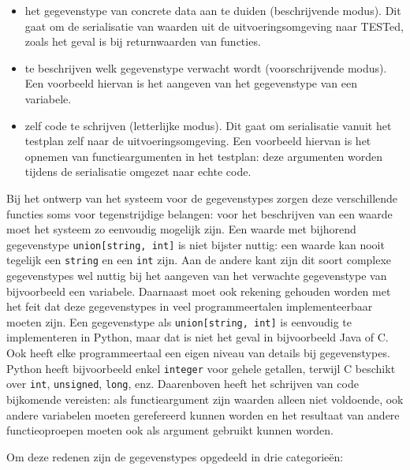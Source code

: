 \begin{itemize}
    \item het gegevenstype van concrete data aan te duiden (beschrijvende modus).
    Dit gaat om de serialisatie van waarden uit de uitvoeringsomgeving naar TESTed, zoals het geval is bij returnwaarden van functies.
    \item te beschrijven welk gegevenstype verwacht wordt (voorschrijvende modus).
    Een voorbeeld hiervan is het aangeven van het gegevenstype van een variabele.
    \item zelf code te schrijven (letterlijke modus).
    Dit gaat om serialisatie vanuit het testplan zelf naar de uitvoeringsomgeving.
    Een voorbeeld hiervan is het opnemen van functieargumenten in het testplan: deze argumenten worden tijdens de serialisatie omgezet naar echte code.
\end{itemize}

Bij het ontwerp van het systeem voor de gegevenstypes zorgen deze verschillende functies soms voor tegenstrijdige belangen: voor het beschrijven van een waarde moet het systeem zo eenvoudig mogelijk zijn.
Een waarde met bijhorend gegevenstype \texttt{union[string, int]} is niet bijster nuttig: een waarde kan nooit tegelijk een \texttt{string} en een \texttt{int} zijn.
Aan de andere kant zijn dit soort complexe gegevenstypes wel nuttig bij het aangeven van het verwachte gegevenstype van bijvoorbeeld een variabele.
Daarnaast moet ook rekening gehouden worden met het feit dat deze gegevenstypes in veel programmeertalen implementeerbaar moeten zijn.
Een gegevenstype als \texttt{union[string, int]} is eenvoudig te implementeren in Python, maar dat is niet het geval in bijvoorbeeld Java of C\@.
Ook heeft elke programmeertaal een eigen niveau van details bij gegevenstypes.
Python heeft bijvoorbeeld enkel \texttt{integer} voor gehele getallen, terwijl C beschikt over \texttt{int}, \texttt{unsigned}, \texttt{long}, enz.
Daarenboven heeft het schrijven van code bijkomende vereisten: als functieargument zijn waarden alleen niet voldoende, ook andere variabelen moeten gerefereerd kunnen worden en het resultaat van andere functieoproepen moeten ook als argument gebruikt kunnen worden.

Om deze redenen zijn de gegevenstypes opgedeeld in drie categorieën:

